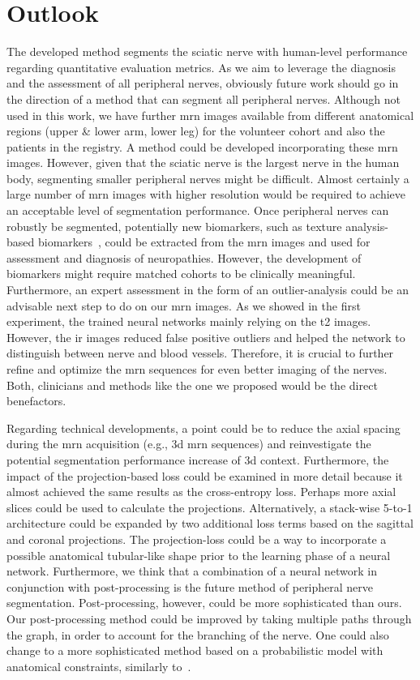 \chapter{Outlook} \label{chap:outlook}
The developed method segments the sciatic nerve with human-level performance regarding quantitative evaluation metrics. As we aim to leverage the diagnosis and the assessment of all peripheral nerves, obviously future work should go in the direction of a method that can segment all peripheral nerves. Although not used in this work, we have further \gls{mrn} images available from different anatomical regions (upper \& lower arm, lower leg) for the volunteer cohort and also the patients in the registry. A method could be developed incorporating these \gls{mrn} images. However, given that the sciatic nerve is the largest nerve in the human body, segmenting smaller peripheral nerves might be difficult. Almost certainly a large number of \gls{mrn} images with higher resolution would be required to achieve an acceptable level of segmentation performance. Once peripheral nerves can robustly be segmented, potentially new biomarkers, such as texture analysis-based biomarkers~\cite{FelisazTextureNeuropathy}, could be extracted from the \gls{mrn} images and used for assessment and diagnosis of neuropathies. However, the development of biomarkers might require matched cohorts to be clinically meaningful. Furthermore, an expert assessment in the form of an outlier-analysis could be an advisable next step to do on our \gls{mrn} images. As we showed in the first experiment, the trained neural networks mainly relying on the \gls{t2} images. However, the \gls{ir} images reduced false positive outliers and helped the network to distinguish between nerve and blood vessels. Therefore, it is crucial to further refine and optimize the \gls{mrn} sequences for even better imaging of the nerves. Both, clinicians and methods like the one we proposed would be the direct benefactors.

Regarding technical developments, a point could be to reduce the axial spacing during the \gls{mrn} acquisition (e.g., \gls{3d} \gls{mrn} sequences) and reinvestigate the potential segmentation performance increase of \gls{3d} context.
Furthermore, the impact of the projection-based loss could be examined in more detail because it almost achieved the same results as the cross-entropy loss. Perhaps more axial slices could be used to calculate the projections. Alternatively, a stack-wise 5-to-1 architecture could be expanded by two additional loss terms based on the sagittal and coronal projections. The projection-loss could be a way to incorporate a possible anatomical tubular-like shape prior to the learning phase of a neural network. Furthermore, we think that a combination of a neural network in conjunction with post-processing is the future method of peripheral nerve segmentation. Post-processing, however, could be more sophisticated than ours. Our post-processing method could be improved by taking multiple paths through the graph, in order to account for the branching of the nerve. One could also change to a more sophisticated method based on a probabilistic model with anatomical constraints, similarly to~\cite{Rempfler2015ReconstructingProgramming}.
\endinput